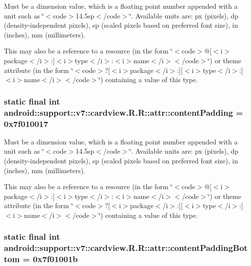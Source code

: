 Must be a dimension value, which is a floating point number appended with a unit such as \char`\"{}$<$code$>$14.5sp$<$/code$>$\char`\"{}. Available units are: px (pixels), dp (density-independent pixels), sp (scaled pixels based on preferred font size), in (inches), mm (millimeters). 

This may also be a reference to a resource (in the form \char`\"{}$<$code$>$@\mbox{[}$<$i$>$package$<$/i$>$:\mbox{]}$<$i$>$type$<$/i$>$:$<$i$>$name$<$/i$>$$<$/code$>$\char`\"{}) or theme attribute (in the form \char`\"{}$<$code$>$?\mbox{[}$<$i$>$package$<$/i$>$:\mbox{]}\mbox{[}$<$i$>$type$<$/i$>$:\mbox{]}$<$i$>$name$<$/i$>$$<$/code$>$\char`\"{}) containing a value of this type. \hypertarget{classandroid_1_1support_1_1v7_1_1cardview_1_1_r_1_1attr_f7f315eef8c265cff6e1c45418671b12}{
\subsubsection[{contentPadding}]{\setlength{\rightskip}{0pt plus 5cm}static final int android::support::v7::cardview.R.R::attr::contentPadding = 0x7f010017}}
\label{classandroid_1_1support_1_1v7_1_1cardview_1_1_r_1_1attr_f7f315eef8c265cff6e1c45418671b12}


Must be a dimension value, which is a floating point number appended with a unit such as \char`\"{}$<$code$>$14.5sp$<$/code$>$\char`\"{}. Available units are: px (pixels), dp (density-independent pixels), sp (scaled pixels based on preferred font size), in (inches), mm (millimeters). 

This may also be a reference to a resource (in the form \char`\"{}$<$code$>$@\mbox{[}$<$i$>$package$<$/i$>$:\mbox{]}$<$i$>$type$<$/i$>$:$<$i$>$name$<$/i$>$$<$/code$>$\char`\"{}) or theme attribute (in the form \char`\"{}$<$code$>$?\mbox{[}$<$i$>$package$<$/i$>$:\mbox{]}\mbox{[}$<$i$>$type$<$/i$>$:\mbox{]}$<$i$>$name$<$/i$>$$<$/code$>$\char`\"{}) containing a value of this type. \hypertarget{classandroid_1_1support_1_1v7_1_1cardview_1_1_r_1_1attr_5a9688b9bba95e88ca45b1c8256e22b2}{
\subsubsection[{contentPaddingBottom}]{\setlength{\rightskip}{0pt plus 5cm}static final int android::support::v7::cardview.R.R::attr::contentPaddingBottom = 0x7f01001b}}
\label{classandroid_1_1support_1_1v7_1_1cardview_1_1_r_1_1attr_5a9688b9bba95e88ca45b1c8256e22b2}



